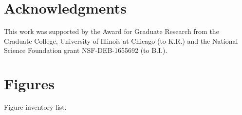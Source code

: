 \documentclass[fleqn,10pt,lineno]{wlpeerj}
\begin{document}
\section*{Acknowledgments}

This work was supported by the Award for Graduate Research from the Graduate College, University of Illinois at Chicago (to K.R.) and the National Science Foundation grant NSF-DEB-1655692 (to B.I.).

\clearpage
%




\pagebreak
\frenchspacing
\setlength{\parindent}{0.0in}

\section*{Figures}
Figure inventory list.
\end{document}
